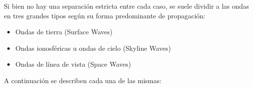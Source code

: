 \begin{tcolorbox}
  Si bien no hay una separaci\'on estricta entre cada caso, se suele
  dividir a las ondas en tres grandes tipos seg\'un su forma
  predominante de propagaci\'on:

   \begin{itemize}
	\item Ondas de tierra (Surface Waves)
	\item Ondas ionosf\'ericas  u ondas de cielo (Skyline Waves)
	\item Ondas de l\'inea de vista (Space Waves)
        \end{itemize}
        
A continuaci\'on se describen cada una de las mismas:

\end{tcolorbox}

